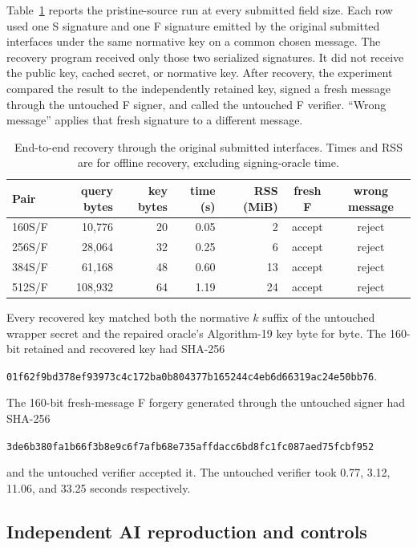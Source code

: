 \documentclass[11pt,a4paper]{article}
\begin{document}
Table~\ref{tab:results} reports the pristine-source run at every submitted field
size.  Each row used one S signature and one F signature emitted by the original
submitted interfaces under the same normative key on a common chosen message.
The recovery program received
only those two serialized signatures.  It did not receive the public key, cached
secret, or normative key.  After recovery, the experiment compared the result to
the independently retained key, signed a fresh message through the untouched F
signer, and called the untouched F verifier.  ``Wrong message'' applies that
fresh signature to a different message.

\begin{table}[ht]
\centering
\caption{End-to-end recovery through the original submitted interfaces.  Times
and RSS are for offline recovery, excluding signing-oracle time.}
\label{tab:results}
\begin{tabular}{lrrrrcc}
\toprule
Pair & query bytes & key bytes & time (s) & RSS (MiB) & fresh F & wrong message\\
\midrule
160S/F & 10,776  & 20 & 0.05 &  2 & accept & reject\\
256S/F & 28,064  & 32 & 0.25 &  6 & accept & reject\\
384S/F & 61,168  & 48 & 0.60 & 13 & accept & reject\\
512S/F &108,932  & 64 & 1.19 & 24 & accept & reject\\
\bottomrule
\end{tabular}
\end{table}

Every recovered key matched both the normative $k$ suffix of the untouched
wrapper secret and the repaired oracle's Algorithm-19 key byte for byte.  The
160-bit retained and recovered key had SHA-256
\begin{center}
\small\texttt{01f62f9bd378ef93973c4c172ba0b804377b165244c4eb6d66319ac24e50bb76}.
\end{center}
The 160-bit fresh-message F forgery generated through the untouched signer had
SHA-256
\begin{center}
\small\texttt{3de6b380fa1b66f3b8e9c6f7afb68e735affdacc6bd8fc1fc087aed75fcbf952}
\end{center}
and the untouched verifier accepted it.  The untouched verifier took 0.77,
3.12, 11.06, and 33.25 seconds respectively.

\subsection{Independent AI reproduction and controls}
\end{document}
